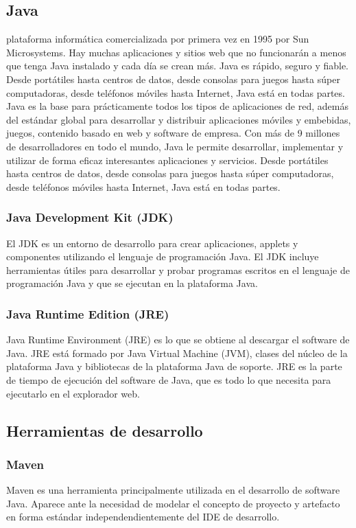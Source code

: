 \subsection{Java} 
plataforma informática comercializada por primera vez en 1995 por Sun
Microsystems. Hay muchas aplicaciones y sitios web que no funcionarán a menos
que tenga Java instalado y cada día se crean más. Java es rápido, seguro y
fiable. Desde portátiles hasta centros de datos, desde consolas para juegos
hasta súper computadoras, desde teléfonos móviles hasta Internet, Java está en
todas partes.\\

Java es la base para prácticamente todos los tipos de aplicaciones de red,
además del estándar global para desarrollar y distribuir aplicaciones móviles y
embebidas, juegos, contenido basado en web y software de empresa. Con más de 9
millones de desarrolladores en todo el mundo, Java le permite desarrollar,
implementar y utilizar de forma eficaz interesantes aplicaciones y servicios.
Desde portátiles hasta centros de datos, desde consolas para juegos hasta súper
computadoras, desde teléfonos móviles hasta Internet, Java está en todas partes.

\subsubsection{Java Development Kit (JDK)} 
El JDK es un entorno de desarrollo
para crear aplicaciones, applets y componentes utilizando el lenguaje de
programación Java. El JDK incluye herramientas útiles para desarrollar y probar
programas escritos en el lenguaje de programación Java y que se ejecutan en la
plataforma Java.\\

\subsubsection{Java Runtime Edition (JRE)} 
Java Runtime Environment (JRE) es lo
que se obtiene al descargar el software de Java. JRE está formado por Java
Virtual Machine (JVM), clases del núcleo de la plataforma Java y bibliotecas de
la plataforma Java de soporte. JRE es la parte de tiempo de ejecución del
software de Java, que es todo lo que necesita para ejecutarlo en el explorador
web.

\subsection{Herramientas de desarrollo} \subsubsection{Maven} 
Maven es una herramienta principalmente utilizada en el desarrollo de software
Java. Aparece ante la necesidad de modelar el concepto de proyecto  y artefacto
en forma estándar independendientemente del IDE de desarrollo.\\

